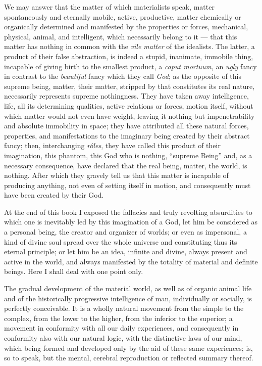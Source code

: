 \documentclass[12pt]{report}
\begin{document}
We may answer that the matter of which materialists speak, matter spontaneously and eternally mobile, active, productive, matter chemically or organically determined and manifested by the properties or forces, mechanical, physical, animal, and intelligent, which necessarily belong to it — that this matter has nothing in common with the \emph{vile matter} of the idealists. The latter, a product of their false abstraction, is indeed a stupid, inanimate, immobile thing, incapable of giving birth to the smallest product, a \emph{caput mortuum}, an \emph{ugly} fancy in contrast to the \emph{beautiful} fancy which they call \emph{God}; as the opposite of this supreme being, matter, their matter, stripped by that constitutes its real nature, necessarily represents supreme nothingness. They have taken away intelligence, life, all its determining qualities, active relations or forces, motion itself, without which matter would not even have weight, leaving it nothing but impenetrability and absolute immobility in space; they have attributed all these natural forces, properties, and manifestations to the imaginary being created by their abstract fancy; then, interchanging \emph{rôles}, they have called this product of their imagination, this phantom, this God who is nothing, “supreme Being” and, as a necessary consequence, have declared that the real being, matter, the world, is nothing. After which they gravely tell us that this matter is incapable of producing anything, not even of setting itself in motion, and consequently must have been created by their God.


At the end of this book I exposed the fallacies and truly revolting absurdities to which one is inevitably led by this imagination of a God, let him be considered as a personal being, the creator and organizer of worlds; or even as impersonal, a kind of divine soul spread over the whole universe and constituting thus its eternal principle; or let him be an idea, infinite and divine, always present and active in the world, and always manifested by the totality of material and definite beings. Here I shall deal with one point only.


The gradual development of the material world, as well as of organic animal life and of the historically progressive intelligence of man, individually or socially, is perfectly conceivable. It is a wholly natural movement from the simple to the complex, from the lower to the higher, from the inferior to the superior; a movement in conformity with all our daily experiences, and consequently in conformity also with our natural logic, with the distinctive laws of our mind, which being formed and developed only by the aid of these same experiences; is, so to speak, but the mental, cerebral reproduction or reflected summary thereof.
\end{document}
